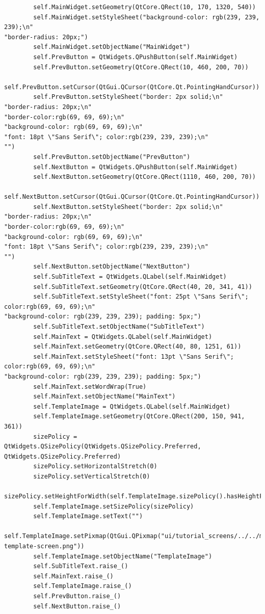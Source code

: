 \documentclass[12pt]{article}
\begin{document}
\begin{lstlisting}
        self.MainWidget.setGeometry(QtCore.QRect(10, 170, 1320, 540))
        self.MainWidget.setStyleSheet("background-color: rgb(239, 239, 239);\n"
"border-radius: 20px;")
        self.MainWidget.setObjectName("MainWidget")
        self.PrevButton = QtWidgets.QPushButton(self.MainWidget)
        self.PrevButton.setGeometry(QtCore.QRect(10, 460, 200, 70))
        self.PrevButton.setCursor(QtGui.QCursor(QtCore.Qt.PointingHandCursor))
        self.PrevButton.setStyleSheet("border: 2px solid;\n"
"border-radius: 20px;\n"
"border-color:rgb(69, 69, 69);\n"
"background-color: rgb(69, 69, 69);\n"
"font: 18pt \"Sans Serif\"; color:rgb(239, 239, 239);\n"
"")
        self.PrevButton.setObjectName("PrevButton")
        self.NextButton = QtWidgets.QPushButton(self.MainWidget)
        self.NextButton.setGeometry(QtCore.QRect(1110, 460, 200, 70))
        self.NextButton.setCursor(QtGui.QCursor(QtCore.Qt.PointingHandCursor))
        self.NextButton.setStyleSheet("border: 2px solid;\n"
"border-radius: 20px;\n"
"border-color:rgb(69, 69, 69);\n"
"background-color: rgb(69, 69, 69);\n"
"font: 18pt \"Sans Serif\"; color:rgb(239, 239, 239);\n"
"")
        self.NextButton.setObjectName("NextButton")
        self.SubTitleText = QtWidgets.QLabel(self.MainWidget)
        self.SubTitleText.setGeometry(QtCore.QRect(40, 20, 341, 41))
        self.SubTitleText.setStyleSheet("font: 25pt \"Sans Serif\"; color:rgb(69, 69, 69);\n"
"background-color: rgb(239, 239, 239); padding: 5px;")
        self.SubTitleText.setObjectName("SubTitleText")
        self.MainText = QtWidgets.QLabel(self.MainWidget)
        self.MainText.setGeometry(QtCore.QRect(40, 80, 1251, 61))
        self.MainText.setStyleSheet("font: 13pt \"Sans Serif\"; color:rgb(69, 69, 69);\n"
"background-color: rgb(239, 239, 239); padding: 5px;")
        self.MainText.setWordWrap(True)
        self.MainText.setObjectName("MainText")
        self.TemplateImage = QtWidgets.QLabel(self.MainWidget)
        self.TemplateImage.setGeometry(QtCore.QRect(200, 150, 941, 361))
        sizePolicy = QtWidgets.QSizePolicy(QtWidgets.QSizePolicy.Preferred, QtWidgets.QSizePolicy.Preferred)
        sizePolicy.setHorizontalStretch(0)
        sizePolicy.setVerticalStretch(0)
        sizePolicy.setHeightForWidth(self.TemplateImage.sizePolicy().hasHeightForWidth())
        self.TemplateImage.setSizePolicy(sizePolicy)
        self.TemplateImage.setText("")
        self.TemplateImage.setPixmap(QtGui.QPixmap("ui/tutorial_screens/../../media/annotated-template-screen.png"))
        self.TemplateImage.setObjectName("TemplateImage")
        self.SubTitleText.raise_()
        self.MainText.raise_()
        self.TemplateImage.raise_()
        self.PrevButton.raise_()
        self.NextButton.raise_()


\end{lstlisting}
\end{document}
